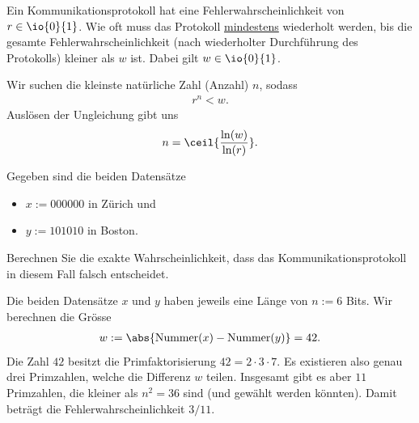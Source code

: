 \begin{questions}
\question[3]

Ein Kommunikationsprotokoll hat eine Fehlerwahrscheinlichkeit von $r\in\io{0}{1}$. Wie oft muss das Protokoll \underline{mindestens} wiederholt werden, bis die gesamte Fehlerwahrscheinlichkeit (nach wiederholter Durchführung des Protokolls) kleiner als $w$ ist. Dabei gilt $w\in\io{0}{1}$. 
\begin{solution}
  Wir suchen die kleinste natürliche Zahl (Anzahl) $n$, sodass
  \begin{align*}
    r^n < w.
  \end{align*}
  Auslösen der Ungleichung gibt uns
  \begin{align*}
    n = \ceil{\frac{\ln(w)}{\ln(r)}}.
  \end{align*}
\end{solution}

\question[3] Gegeben sind die beiden Datensätze
\begin{itemize}
  \item $x := 000000$ in Zürich und
  \item $y := 101010$ in Boston.
\end{itemize}
Berechnen Sie die exakte Wahrscheinlichkeit, dass das Kommunikationsprotokoll in diesem Fall falsch entscheidet.
\begin{solution}
  Die beiden Datensätze $x$ und $y$ haben jeweils eine Länge von $n := 6$ Bits.
  Wir berechnen die Grösse
  \begin{align*}
    w := \abs{\text{Nummer}(x) - \text{Nummer}(y)} = 42.
  \end{align*}
Die Zahl $42$ besitzt die Primfaktorisierung $42 = 2\cdot 3\cdot 7$. Es existieren also genau drei Primzahlen, welche die Differenz $w$ teilen. Insgesamt gibt es aber $11$ Primzahlen, die kleiner als $n^2 = 36$ sind (und gewählt werden könnten). Damit beträgt die Fehlerwahrscheinlichkeit $3/11$.  
\end{solution}


\end{questions}
